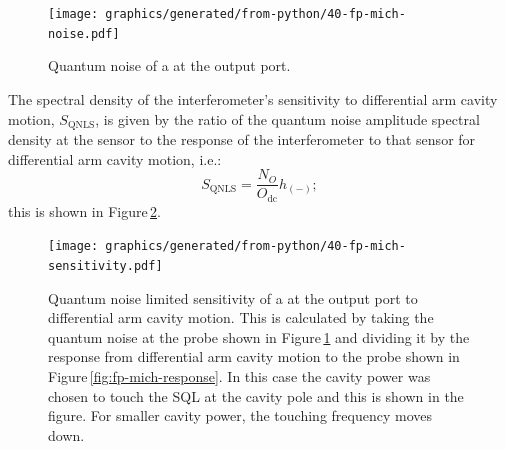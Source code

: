 \begin{figure}
  \centering
  \texttt{[image: graphics/generated/from-python/40-fp-mich-noise.pdf]}
  \caption[Quantum noise of a \FPMI{} at the output port]{\label{fig:fp-mich-noise}Quantum noise of a \FPMI{} at the output port.}
\end{figure}

The spectral density of the interferometer's sensitivity to differential arm cavity motion, $S_{\text{QNLS}}$, is given by the ratio of the quantum noise amplitude spectral density at the sensor to the response of the interferometer to that sensor for differential arm cavity motion, i.e.:
\begin{equation}
  S_{\text{QNLS}} = \frac{N_O}{O_{\text{dc}}} h_{\left( - \right)};
\end{equation}
this is shown in Figure\,\ref{fig:fp-mich-sensitivity}.

\begin{figure}
  \centering
  \texttt{[image: graphics/generated/from-python/40-fp-mich-sensitivity.pdf]}
  \caption[Sensitivity of a \FPMI{} at the output port to differential arm cavity motion]{\label{fig:fp-mich-sensitivity}Quantum noise limited sensitivity of a \FPMI{} at the output port to differential arm cavity motion. This is calculated by taking the quantum noise at the probe shown in Figure\,\ref{fig:fp-mich-noise} and dividing it by the response from differential arm cavity motion to the probe shown in Figure\,\ref{fig:fp-mich-response}. In this case the cavity power was chosen to touch the \gls{SQL} at the cavity pole and this is shown in the figure. For smaller cavity power, the touching frequency moves down.}
\end{figure}

